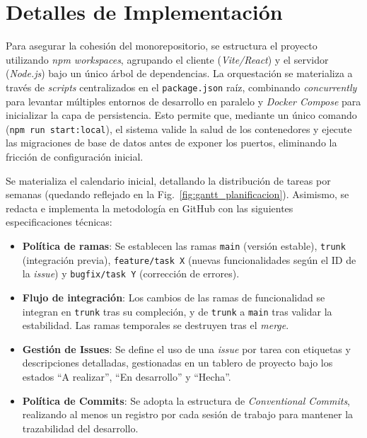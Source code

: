\section{Detalles de Implementación}
Para asegurar la cohesión del monorepositorio, se estructura el proyecto utilizando \textit{npm workspaces}, agrupando el cliente (\textit{Vite/React}) y el servidor (\textit{Node.js}) bajo un único árbol de dependencias. La orquestación se materializa a través de \textit{scripts} centralizados en el \texttt{package.json} raíz, combinando \textit{concurrently} para levantar múltiples entornos de desarrollo en paralelo y \textit{Docker Compose} para inicializar la capa de persistencia. Esto permite que, mediante un único comando (\texttt{npm run start:local}), el sistema valide la salud de los contenedores y ejecute las migraciones de base de datos antes de exponer los puertos, eliminando la fricción de configuración inicial.

Se materializa el calendario inicial, detallando la distribución de tareas por semanas (quedando reflejado en la Fig.~\ref{fig:gantt_planificacion}). Asimismo, se redacta e implementa la metodología en GitHub con las siguientes especificaciones técnicas:
\begin{itemize}
    \item \textbf{Política de ramas}: Se establecen las ramas \texttt{main} (versión estable), \texttt{trunk} (integración previa), \texttt{feature/task X} (nuevas funcionalidades según el ID de la \textit{issue}) y \texttt{bugfix/task Y} (corrección de errores).
    \item \textbf{Flujo de integración}: Los cambios de las ramas de funcionalidad se integran en \texttt{trunk} tras su compleción, y de \texttt{trunk} a \texttt{main} tras validar la estabilidad. Las ramas temporales se destruyen tras el \textit{merge}.
    \item \textbf{Gestión de Issues}: Se define el uso de una \textit{issue} por tarea con etiquetas y descripciones detalladas, gestionadas en un tablero de proyecto bajo los estados ``A realizar'', ``En desarrollo'' y ``Hecha''.
    \item \textbf{Política de Commits}: Se adopta la estructura de \textit{Conventional Commits}, realizando al menos un registro por cada sesión de trabajo para mantener la trazabilidad del desarrollo.
\end{itemize}


